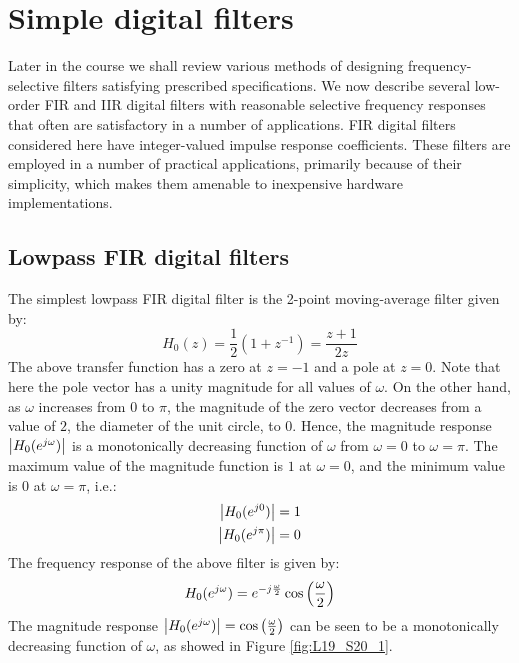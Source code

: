 \documentclass[../../main/main.tex]{subfiles}
\begin{document}
\section{Simple digital filters}
Later in the course we shall review various methods of designing frequency-selective filters satisfying prescribed specifications. We now describe several low-order FIR and IIR digital filters with reasonable selective frequency responses that often are satisfactory in a number of applications.
FIR digital filters considered here have integer-valued impulse response coefficients. These filters are employed in a number of practical applications, primarily because of their simplicity, which makes them amenable to inexpensive hardware implementations.



\subsection{Lowpass FIR digital filters}
The simplest lowpass FIR digital filter is the 2-point moving-average filter given by:
\begin{equation}
    H_{0}(z)
    =
    \frac{1}{2} (1+z^{-1})
    =
    \frac{z+1}{2z}
    \label{eq:L19_S17_1}
\end{equation}
The above transfer function has a zero at \( z = -1 \) and a pole at \( z = 0 \). Note that here the pole vector has a unity magnitude for all values of \( \omega \).
On the other hand, as \( \omega \) increases from \( 0 \) to \( \pi \), the magnitude of the zero vector decreases from a value of \( 2 \), the diameter of the unit circle, to \( 0 \). Hence, the magnitude response \( \abs{H_{0}(e^{j\omega})} \) is a monotonically decreasing function of \( \omega \) from \( \omega = 0 \) to \( \omega = \pi \).
The maximum value of the magnitude function is \( 1 \) at \( \omega = 0 \), and the minimum value is \( 0 \) at \( \omega = \pi \), i.e.:
\begin{align}
    \abs{H_{0}(e^{j0})} &= 1    \\
    \abs{H_{0}(e^{j\pi})} &= 0
\end{align}
The frequency response of the above filter is given by:
\begin{equation}
    H_{0}(e^{j\omega})
    =
    e^{-j\frac{\omega}{2}} \cos\qty(\frac{\omega}{2})
    \label{eq:L19_S19_2}
\end{equation}
The magnitude response \( \abs{H_{0}(e^{j\omega})} = \cos\qty(\frac{\omega}{2}) \) can be seen to be a monotonically decreasing function of \( \omega \), as showed in Figure \ref{fig:L19_S20_1}.
\end{document}
